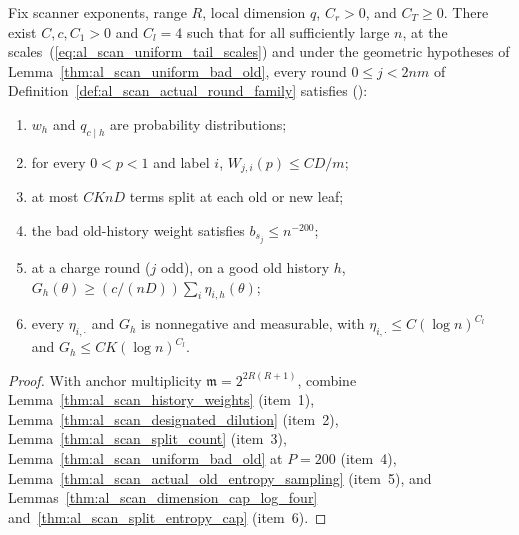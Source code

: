 \begin{lemma}
    \label{thm:al_scan_actual_history_facts}
    \leanok
    Fix scanner exponents, range $R$, local dimension $q$, $C_r>0$, and
    $C_T\ge0$. There exist $C,c,C_1>0$ and $C_l=4$ such that for all
    sufficiently large $n$, at the scales~(\ref{eq:al_scan_uniform_tail_scales})
    and under the geometric hypotheses of Lemma~\ref{thm:al_scan_uniform_bad_old},
    every round $0\le j<2nm$ of Definition~\ref{def:al_scan_actual_round_family}
    satisfies (\cite[Lemma~9.1 and Proposition~9.2]{OpenAI2026AreaLaw}):
    \begin{enumerate}
        \item $w_h$ and $q_{c\mid h}$ are probability distributions;
        \item for every $0<p<1$ and label $i$, $W_{j,i}(p)\le CD/m$;
        \item at most $CKnD$ terms split at each old or new leaf;
        \item the bad old-history weight satisfies $b_{s_j}\le n^{-200}$;
        \item at a charge round ($j$ odd), on a good old history $h$,
              $G_h(\theta)\ge(c/(nD))\sum_i\eta_{i,h}(\theta)$;
        \item every $\eta_{i,\cdot}$ and $G_h$ is nonnegative and measurable,
              with $\eta_{i,\cdot}\le C(\log n)^{C_l}$ and
              $G_h\le CK(\log n)^{C_l}$.
    \end{enumerate}
\end{lemma}
\begin{proof}\leanok
    With anchor multiplicity $\mathfrak m=2^{2R(R+1)}$, combine
    Lemma~\ref{thm:al_scan_history_weights} (item~1),
    Lemma~\ref{thm:al_scan_designated_dilution} (item~2),
    Lemma~\ref{thm:al_scan_split_count} (item~3),
    Lemma~\ref{thm:al_scan_uniform_bad_old} at $P=200$ (item~4),
    Lemma~\ref{thm:al_scan_actual_old_entropy_sampling} (item~5), and
    Lemmas~\ref{thm:al_scan_dimension_cap_log_four}
    and~\ref{thm:al_scan_split_entropy_cap} (item~6).
\end{proof}

